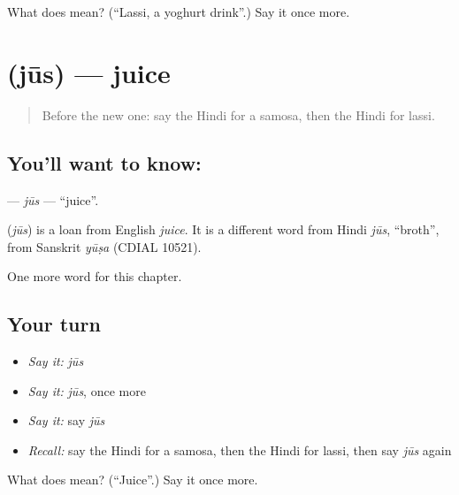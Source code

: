\begin{tcolorbox}[breakable,colback=teal!4,colframe=teal!35!black,title={Before you move on}]
What does  mean? (\textquotedblleft{}Lassi, a yoghurt drink\textquotedblright{}.) Say it once more.
\end{tcolorbox}
\section[\texorpdfstring{\hi{जूस} (jūs)}{जूस (jūs)}]{ (jūs) — juice}

\label{lesson:HI-C142-jus}



\begin{quote}
Before the new one: say the Hindi for a samosa, then the Hindi for lassi.
\end{quote}

\subsection*{You'll want to know: }
\textbf{} — \emph{jūs} — \textquotedblleft{}juice\textquotedblright{}.

\begin{cousinweb}
\textbf{} (\emph{jūs}) is a loan from English \emph{juice}. It is a different word from Hindi \emph{jūs}, \textquotedblleft{}broth\textquotedblright{}, from Sanskrit \emph{yūṣa} (CDIAL 10521).
\end{cousinweb}

\begin{grammarlens}[title={What you've built}]
One more word for this chapter.
\end{grammarlens}

\subsection*{Your turn}
\begin{itemize}
\raggedright
  \item \emph{Say it:} \emph{jūs}
  \item \emph{Say it:} \emph{jūs}, once more
  \item \emph{Say it:} say \emph{jūs}
  \item \emph{Recall:} say the Hindi for a samosa, then the Hindi for lassi, then say \emph{jūs} again
\end{itemize}

\begin{tcolorbox}[breakable,colback=teal!4,colframe=teal!35!black,title={Before you move on}]
What does  mean? (\textquotedblleft{}Juice\textquotedblright{}.) Say it once more.
\end{tcolorbox}
